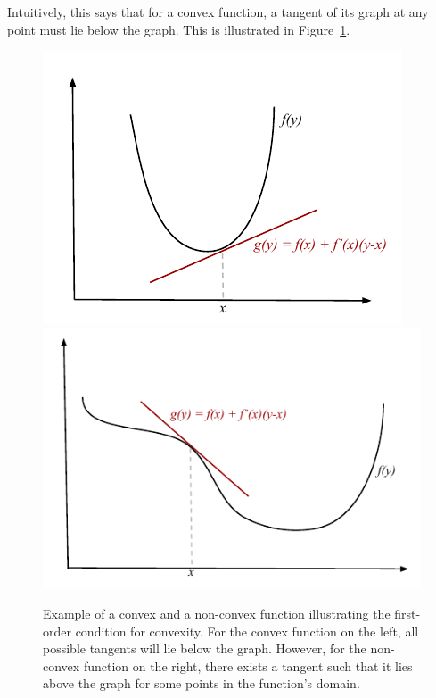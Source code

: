 \documentclass{article}
\begin{document}
Intuitively, this says that for a convex function, a tangent of its graph at any point must lie below the graph. This is illustrated in Figure~\ref{fig:firstorder}.\\

\begin{figure}[ht]
\centering
    \includegraphics[height=0.2\textheight]{figures/first_order.pdf}
    \includegraphics[height=0.2\textheight]{figures/first_order_quasi.pdf}
    \caption{Example of a convex and a non-convex function illustrating the first-order condition for convexity. For the convex function on the left, all possible tangents will lie below the graph. However, for the non-convex function on the right, there exists a tangent such that it lies above the graph for some points in the function's domain.}
    \label{fig:firstorder}
\end{figure}
\end{document}
